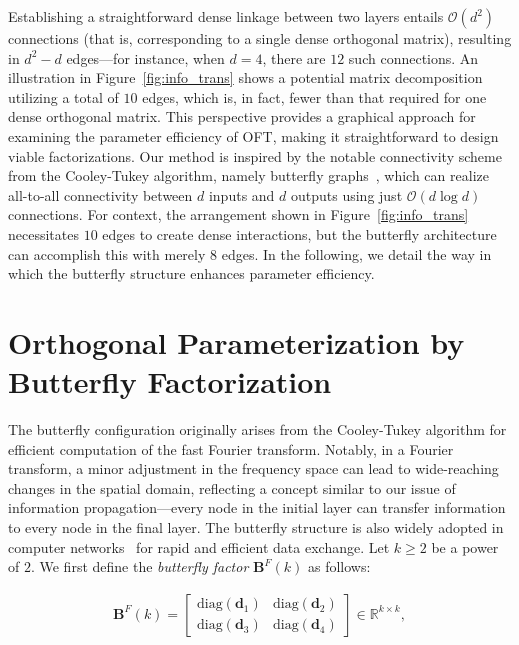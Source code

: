 Establishing a straightforward dense linkage between two layers entails $\mathcal{O}(d^2)$ connections (that is, corresponding to a single dense orthogonal matrix), resulting in $d^2-d$ edges—for instance, when $d=4$, there are $12$ such connections. An illustration in Figure~\ref{fig:info_trans} shows a potential matrix decomposition utilizing a total of $10$ edges, which is, in fact, fewer than that required for one dense orthogonal matrix. This perspective provides a graphical approach for examining the parameter efficiency of OFT, making it straightforward to design viable factorizations. Our method is inspired by the notable connectivity scheme from the Cooley-Tukey algorithm, namely butterfly graphs~\cite{cooley1965algorithm}, which can realize all-to-all connectivity between $d$ inputs and $d$ outputs using just $\mathcal{O}(d\log d)$ connections. For context, the arrangement shown in Figure~\ref{fig:info_trans} necessitates $10$ edges to create dense interactions, but the butterfly architecture can accomplish this with merely $8$ edges. In the following, we detail the way in which the butterfly structure enhances parameter efficiency.

\section{Orthogonal Parameterization by Butterfly Factorization}

The butterfly configuration originally arises from the Cooley-Tukey algorithm for efficient computation of the fast Fourier transform. Notably, in a Fourier transform, a minor adjustment in the frequency space can lead to wide-reaching changes in the spatial domain, reflecting a concept similar to our issue of information propagation—every node in the initial layer can transfer information to every node in the final layer. The butterfly structure is also widely adopted in computer networks~\cite{solihin2015fundamentals,li2011linear} for rapid and efficient data exchange. Let $k\geq 2$ be a power of $2$. We first define the \emph{butterfly factor} $\bm{B}^F(k)$ as follows:

\begin{equation}\label{eq:but_factor}
\begin{aligned}
    \bm{B}^F(k)=\begin{bmatrix}
    \text{diag}(\bm{d}_1) & \text{diag}(\bm{d}_2) \\
    \text{diag}(\bm{d}_3) & \text{diag}(\bm{d}_4)
    \end{bmatrix}\in\mathbb{R}^{k\times k},
\end{aligned}
\end{equation}

